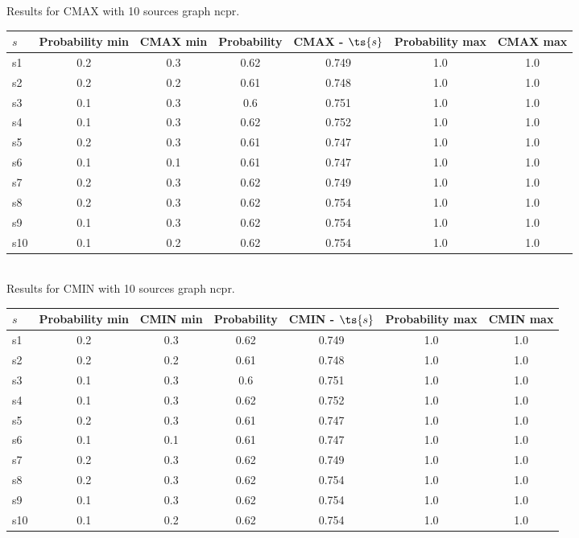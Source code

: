\documentclass{article}
\begin{document}
\noindent Results for CMAX with 10 sources graph ncpr.

\noindent\begin{tabular}{|l|c|c|c|c|c|c|}
\hline
$s$& Probability min & CMAX min & Probability & CMAX - $\ts{s}$ & Probability max & CMAX max\\
\hline
s1 &0.2 & 0.3 & 0.62 & 0.749 & 1.0 & 1.0\\
\hline
s2 &0.2 & 0.2 & 0.61 & 0.748 & 1.0 & 1.0\\
\hline
s3 &0.1 & 0.3 & 0.6 & 0.751 & 1.0 & 1.0\\
\hline
s4 &0.1 & 0.3 & 0.62 & 0.752 & 1.0 & 1.0\\
\hline
s5 &0.2 & 0.3 & 0.61 & 0.747 & 1.0 & 1.0\\
\hline
s6 &0.1 & 0.1 & 0.61 & 0.747 & 1.0 & 1.0\\
\hline
s7 &0.2 & 0.3 & 0.62 & 0.749 & 1.0 & 1.0\\
\hline
s8 &0.2 & 0.3 & 0.62 & 0.754 & 1.0 & 1.0\\
\hline
s9 &0.1 & 0.3 & 0.62 & 0.754 & 1.0 & 1.0\\
\hline
s10 &0.1 & 0.2 & 0.62 & 0.754 & 1.0 & 1.0\\
\hline
\end{tabular}\\

\noindent Results for CMIN with 10 sources graph ncpr.

\noindent\begin{tabular}{|l|c|c|c|c|c|c|}
\hline
$s$& Probability min & CMIN min & Probability & CMIN - $\ts{s}$ & Probability max & CMIN max\\
\hline
s1 &0.2 & 0.3 & 0.62 & 0.749 & 1.0 & 1.0\\
\hline
s2 &0.2 & 0.2 & 0.61 & 0.748 & 1.0 & 1.0\\
\hline
s3 &0.1 & 0.3 & 0.6 & 0.751 & 1.0 & 1.0\\
\hline
s4 &0.1 & 0.3 & 0.62 & 0.752 & 1.0 & 1.0\\
\hline
s5 &0.2 & 0.3 & 0.61 & 0.747 & 1.0 & 1.0\\
\hline
s6 &0.1 & 0.1 & 0.61 & 0.747 & 1.0 & 1.0\\
\hline
s7 &0.2 & 0.3 & 0.62 & 0.749 & 1.0 & 1.0\\
\hline
s8 &0.2 & 0.3 & 0.62 & 0.754 & 1.0 & 1.0\\
\hline
s9 &0.1 & 0.3 & 0.62 & 0.754 & 1.0 & 1.0\\
\hline
s10 &0.1 & 0.2 & 0.62 & 0.754 & 1.0 & 1.0\\
\hline
\end{tabular}\\
\end{document}

